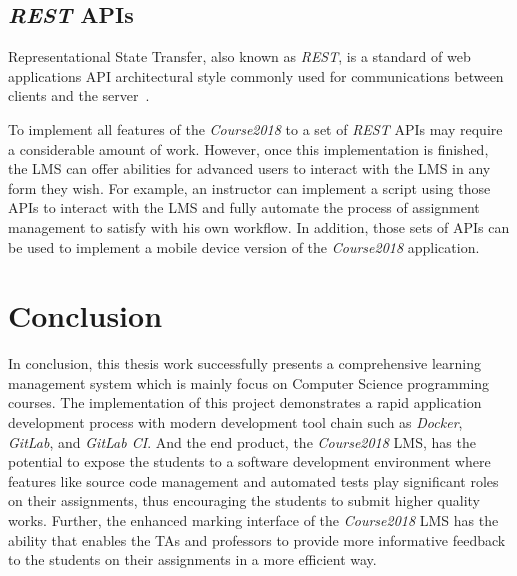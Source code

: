 \subsection{\emph{REST} APIs}
Representational State Transfer, also known as \emph{REST}, is a standard of
web applications API architectural style commonly used for communications
between clients and the server~\citep[Chapter 5]{REST}.

To implement all features of the \emph{Course2018} to a set of \emph{REST} APIs
may require a considerable amount of work. However, once this implementation is
finished, the LMS can offer abilities for advanced users to interact with the
LMS in any form they
wish. For example, an instructor can implement a script using those APIs to
interact with the LMS and fully automate the process of assignment management
to satisfy with his own workflow. In addition, those sets of APIs can be used
to implement a mobile device version of the \emph{Course2018} application.


\section{Conclusion}
In conclusion, this thesis work successfully presents a comprehensive
learning management system which is mainly focus on Computer Science
programming courses. The implementation of this project demonstrates
a rapid application development process with modern development tool chain
such as \emph{Docker}, \emph{GitLab}, and \emph{GitLab CI}.
And the end product, the \emph{Course2018} LMS, has the potential to expose the
students to a
software development environment where features like source code management and
automated tests play significant roles on their assignments, thus encouraging
the students to submit higher quality works.
Further,
the enhanced marking interface of the \emph{Course2018} LMS 
has the ability that enables the TAs and professors to provide more informative
feedback to the students on their assignments in a more efficient way.